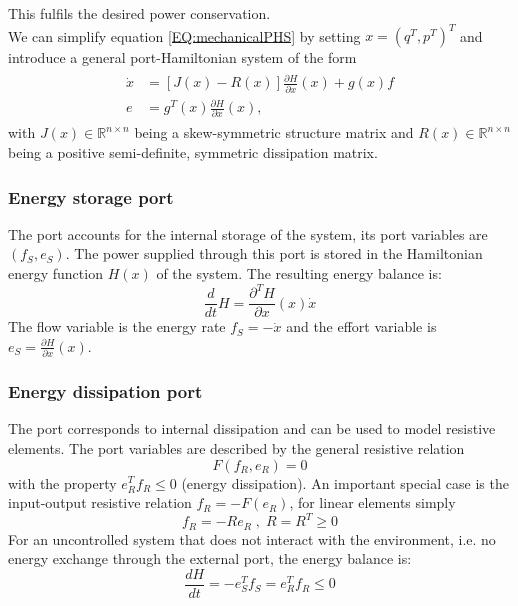 \documentclass[a4paper,twoside, openright,12pt]{report}
\begin{document}
This fulfils the desired power conservation.\\
We can simplify equation \ref{EQ:mechanicalPHS} by setting $x = (q^T,p^T)^T$ and introduce a general port-Hamiltonian system of the form
\begin{eqnarray}\label{EQ:generalPHS}
\begin{aligned}
\dot{x} &= [J(x)-R(x)]\frac{\partial H}{\partial x}(x) + g(x)f\\
e &= g^T(x)\frac{\partial H}{\partial x}(x),
\end{aligned}
\end{eqnarray}
with $J(x) \in \mathbb{R}^{n\times n}$ being a skew-symmetric structure matrix and $R(x)  \in  \mathbb{R}^{n\times n}$ being a positive semi-definite, symmetric dissipation matrix.

\subsubsection{Energy storage port}
The port accounts for the internal storage of the system, its port variables are $ (f_S,e_S) $. The power supplied through this port is stored in the Hamiltonian energy function $H(x)$ of the system. The resulting energy balance is:
\begin{equation}\label{EQ:storageport}
	\frac{d}{dt}H = \frac{\partial^T H}{\partial x}(x) \dot{x}
\end{equation}
The flow variable is the energy rate $ f_S = -\dot{x} $ and the effort variable is $ e_S = \frac{\partial H}{\partial x}(x) $.

\subsubsection{Energy dissipation port}
The port corresponds to internal dissipation and can be used to model resistive elements. The port variables are described by the general resistive relation
\begin{equation}
	F(f_R,e_R)=0
\end{equation}
with the property  $ e_R^T  f_R \leq 0 $ (energy dissipation). An important special case is the input-output resistive relation $f_R = -F(e_R)$, for linear elements simply
\begin{equation}
f_R = -Re_R \; , \; R=R^T\geq0
\end{equation}
For an uncontrolled system that does not interact with the environment, i.e. no energy exchange through the  external port, the energy balance is:
\begin{equation}
	\frac{dH}{dt} = -e_S^Tf_S = e_R^T f_R \leq 0
\end{equation}
\end{document}
